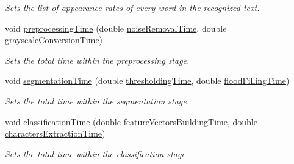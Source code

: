 \begin{CompactItemize}
\begin{CompactList}\small\item\em Sets the list of appearance rates of every word in the recognized text. \item\end{CompactList}\item 
void \hyperlink{class_statistics_ada0f8014981618cc90e1e0020cd7a50}{preprocessingTime} (double \hyperlink{class_statistics_4a194feb4de2fc619d311b2adb2a7e74}{noiseRemovalTime}, double \hyperlink{class_statistics_fc22ca2705714cfc44c45c772475c1cb}{grayscaleConversionTime})
\begin{CompactList}\small\item\em Sets the total time within the preprocessing stage. \item\end{CompactList}\item 
void \hyperlink{class_statistics_cb7b96b88345347bc41b586f283905fd}{segmentationTime} (double \hyperlink{class_statistics_e2c88c8b599b217ad3f316cca7a15a23}{thresholdingTime}, double \hyperlink{class_statistics_6c2cd48482d1de181cb2dd32b3315449}{floodFillingTime})
\begin{CompactList}\small\item\em Sets the total time within the segmentation stage. \item\end{CompactList}\item 
void \hyperlink{class_statistics_59bf0acb599fbfb44211669a32f0cce6}{classificationTime} (double \hyperlink{class_statistics_ae46d5f7b2a374dd79b15533facc9e6c}{featureVectorsBuildingTime}, double \hyperlink{class_statistics_1e09de36cf3a65ab2a471e877578257d}{charactersExtractionTime})
\begin{CompactList}\small\item\em Sets the total time within the classification stage. \item\end{CompactList}\end{CompactItemize}
